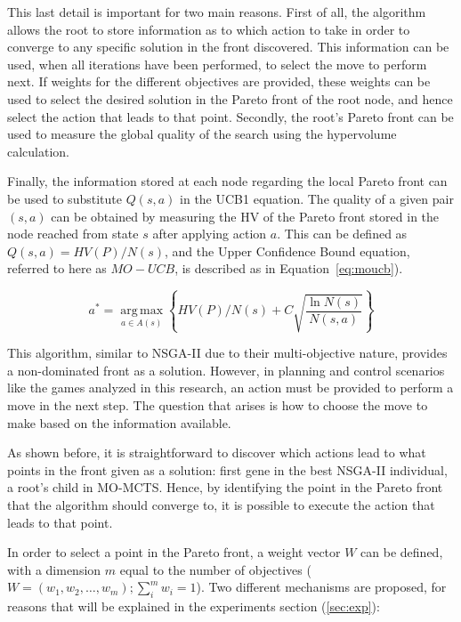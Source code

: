 \documentclass[journal]{IEEEtran}
\newcommand{\argmax}{\operatorname*{arg\,max}}
\providecommand{\DIFaddtex}[1]{{\protect\color{blue}\uwave{#1}}} %
\providecommand{\DIFaddbegin}{} %
\providecommand{\DIFaddend}{} %
\providecommand{\DIFadd}[1]{\texorpdfstring{\DIFaddtex{#1}}{#1}} %
\begin{document}
This last detail is important for two main reasons. First of all, the algorithm allows the root to store information as to which action to take in order to converge to any specific solution in the front discovered. This information can be used, when all iterations have been performed, to select the move to perform next. If weights for the different objectives are provided, these weights can be used to select the desired solution in the Pareto front \DIFaddbegin \DIFadd{approximation }\DIFaddend of the root node, and hence select the action that leads to that point. Secondly, the root's Pareto front can be used to measure the global quality of the search using the hypervolume calculation.

Finally, the information stored at each node regarding the local Pareto front \DIFaddbegin \DIFadd{approximation }\DIFaddend can be used to substitute $Q(s,a)$ in the UCB1 equation. The quality of a given pair $(s,a)$ can be obtained by measuring the HV of the Pareto front stored in the node reached from state $s$ after applying action $a$. This can be defined as  $Q(s,a) = HV(P)/N(s)$, and the Upper Confidence Bound equation, referred to here as $MO-UCB$, is described as in Equation~\ref{eq:moucb}). 

\begin{equation}	\label{eq:moucb}
a^* = \argmax_{a \in A(s)} \left\{HV(P)/N(s) + C \sqrt{\frac{ \ln N(s) }{ N(s,a) }}\right\}
\end{equation}

This algorithm, similar to NSGA-II due to their multi-objective nature, provides a non-dominated front as a solution. However, in planning and control scenarios like the games analyzed in this research, an action must be provided to perform a move in the next step. The question that arises is how to choose the move to make based on the information available.

As shown before, it is straightforward to discover which actions lead to what points in the front given as a solution: \DIFaddbegin \DIFadd{the }\DIFaddend first gene in the best NSGA-II individual, a root's child in MO-MCTS. Hence, by identifying the point in the Pareto front \DIFaddbegin \DIFadd{approximation }\DIFaddend that the algorithm should converge to, it is possible to execute the action that leads to that point.

In order to select a point in the Pareto front, a weight vector $W$ can be defined, with a dimension $m$ equal to the number of objectives ($W = (w_1, w_2, \dots, w_m); \sum_{i}^{m} w_i = 1$). Two different mechanisms are proposed, for reasons that will be explained in the experiments section (\ref{sec:exp}):
\end{document}
